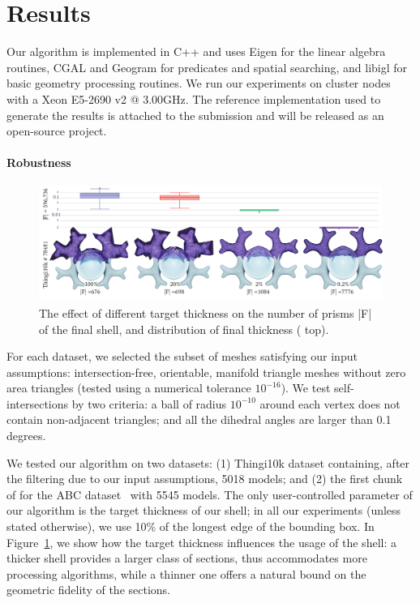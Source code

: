 \section{Results}
\label{prism:sec:results}
Our algorithm is implemented in C++ and uses Eigen \cite{eigenweb} for the linear algebra routines, CGAL  and Geogram \cite{levy2015geogram} for predicates and spatial searching, and libigl \cite{jacobson2016libigl} for basic geometry processing routines.
We run our experiments on cluster nodes with a Xeon E5-2690 v2 @ 3.00GHz.
The reference implementation used to generate the results is attached to the submission and will be released as an open-source project.

\paragraph{Robustness}

\begin{figure}
    \centering
    \includegraphics[width=\linewidth,draft=false]{prism-tex/figs/varying_thickness}
    \caption{The effect of different target thickness on the number of prisms |F| of the final shell, 
    and distribution of final thickness ( top).} 
    
    \label{prism:fig:vary_thick}
\end{figure}

For each dataset, we selected the subset of meshes satisfying our input assumptions:  intersection-free, orientable, manifold triangle meshes without zero area triangles (tested using a numerical tolerance $10^{-16}$).  We test self-intersections by two criteria: a ball of radius $10^{-10}$ around each vertex does not contain non-adjacent triangles; and all the dihedral angles are larger than 0.1 degrees.

We tested our algorithm on two datasets: (1) Thingi10k dataset \cite{zhou2016thingi10k} containing, after the filtering due to our input assumptions, 5018 models; and (2) the first chunk of for the ABC dataset~\cite{koch2019abc} with 5545 models.
The only user-controlled parameter of our algorithm is the target thickness of our shell; in all our experiments (unless stated otherwise), we use 10\% of the longest edge of the bounding box. 
In Figure~\ref{prism:fig:vary_thick}, we show how the target thickness influences the usage of the shell: a thicker shell provides a larger class of sections, thus accommodates more processing algorithms, while a thinner one offers a natural bound on the geometric fidelity of the sections.

